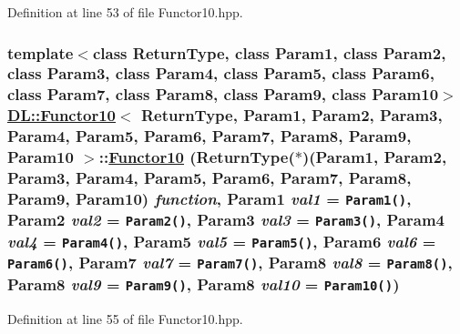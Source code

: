 Definition at line 53 of file Functor10.hpp.\hypertarget{classDL_1_1Functor10_a0}{
\subsubsection[Functor10]{\setlength{\rightskip}{0pt plus 5cm}template$<$class Return\-Type, class Param1, class Param2, class Param3, class Param4, class Param5, class Param6, class Param7, class Param8, class Param9, class Param10$>$ \hyperlink{classDL_1_1Functor10}{DL::Functor10}$<$ Return\-Type, Param1, Param2, Param3, Param4, Param5, Param6, Param7, Param8, Param9, Param10 $>$::\hyperlink{classDL_1_1Functor10}{Functor10} (Return\-Type($\ast$)(Param1, Param2, Param3, Param4, Param5, Param6, Param7, Param8, Param9, Param10) {\em function}, Param1 {\em val1} = {\tt Param1()}, Param2 {\em val2} = {\tt Param2()}, Param3 {\em val3} = {\tt Param3()}, Param4 {\em val4} = {\tt Param4()}, Param5 {\em val5} = {\tt Param5()}, Param6 {\em val6} = {\tt Param6()}, Param7 {\em val7} = {\tt Param7()}, Param8 {\em val8} = {\tt Param8()}, Param8 {\em val9} = {\tt Param9()}, Param8 {\em val10} = {\tt Param10()})}}
\label{classDL_1_1Functor10_a0}




Definition at line 55 of file Functor10.hpp.

